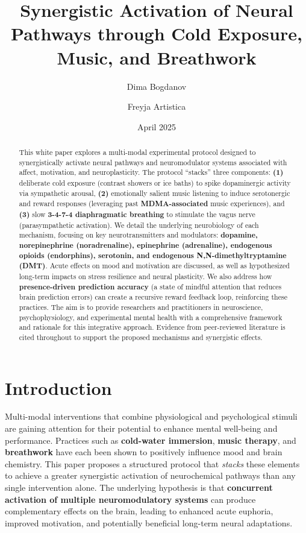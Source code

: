 \documentclass[11pt]{article}
\title{\textbf{Synergistic Activation of Neural Pathways through Cold Exposure, Music, and Breathwork}}
\author{Dima Bogdanov}
\author{Freyja Artistica}
\affil[1]{Neural Interface Cognition Lab}
\date{April 2025}
\newcommand{\quotes}[1]{``#1''}
\begin{document}
\maketitle

\begin{abstract}
This white paper explores a multi-modal experimental protocol designed to synergistically activate neural pathways and neuromodulator systems associated with affect, motivation, and neuroplasticity. The protocol \quotes{stacks} three components: \textbf{(1)} deliberate cold exposure (contrast showers or ice baths) to spike dopaminergic activity via sympathetic arousal, \textbf{(2)} emotionally salient music listening to induce serotonergic and reward responses (leveraging past \textbf{MDMA-associated} music experiences), and \textbf{(3)} slow \textbf{3-4-7-4 diaphragmatic breathing} to stimulate the vagus nerve (parasympathetic activation). We detail the underlying neurobiology of each mechanism, focusing on key neurotransmitters and modulators: \textbf{dopamine, norepinephrine (noradrenaline), epinephrine (adrenaline), endogenous opioids (endorphins), serotonin, and endogenous N,N-dimethyltryptamine (DMT)}. Acute effects on mood and motivation are discussed, as well as hypothesized long-term impacts on stress resilience and neural plasticity. We also address how \textbf{presence-driven prediction accuracy} (a state of mindful attention that reduces brain prediction errors) can create a recursive reward feedback loop, reinforcing these practices. The aim is to provide researchers and practitioners in neuroscience, psychophysiology, and experimental mental health with a comprehensive framework and rationale for this integrative approach. Evidence from peer-reviewed literature is cited throughout to support the proposed mechanisms and synergistic effects.
\end{abstract}

\section{Introduction}
Multi-modal interventions that combine physiological and psychological stimuli are gaining attention for their potential to enhance mental well-being and performance. Practices such as \textbf{cold-water immersion}, \textbf{music therapy}, and \textbf{breathwork} have each been shown to positively influence mood and brain chemistry. This paper proposes a structured protocol that \textit{stacks} these elements to achieve a greater synergistic activation of neurochemical pathways than any single intervention alone. The underlying hypothesis is that \textbf{concurrent activation of multiple neuromodulatory systems} can produce complementary effects on the brain, leading to enhanced acute euphoria, improved motivation, and potentially beneficial long-term neural adaptations.
\end{document}
